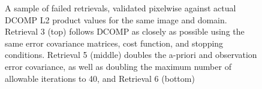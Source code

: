 \documentclass[12pt]{article}
\begin{document}
\begin{figure}[h!]
\begin{center}
{        }
    \end{center}
    \caption{A sample of failed retrievals, validated pixelwise against actual DCOMP L2 product values for the same image and domain. Retrieval 3 (top) follows DCOMP as closely as possible using the same error covariance matrices, cost function, and stopping conditions. Retrieval 5 (middle) doubles the a-priori and observation error covariance, as well as doubling the maximum number of allowable iterations to 40, and Retrieval 6 (bottom)}
    \label{bad_retrievals}
\end{figure}

\clearpage


\end{document}
